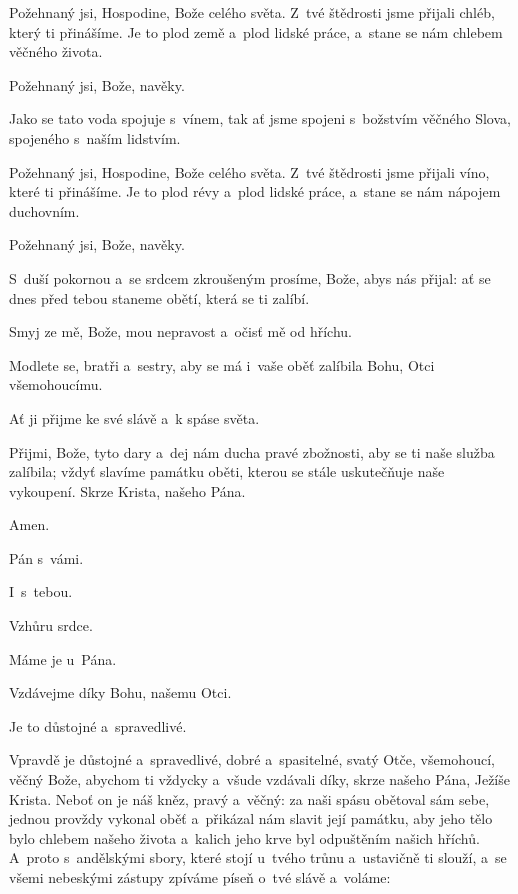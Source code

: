 \mbox{}

Požehnaný jsi, Hospodine, Bože celého světa. Z~tvé štědrosti jsme přijali chléb, který ti přinášíme. Je to plod země a~plod lidské práce, a~stane se nám chlebem věčného života.

\Rbardot{} Požehnaný jsi, Bože, navěky.

Jako se tato voda spojuje s~vínem, tak ať jsme spojeni s~božstvím věčného Slova, spojeného s~naším lidstvím.

Požehnaný jsi, Hospodine, Bože celého světa. Z~tvé štědrosti jsme přijali víno, které ti přinášíme. Je to plod révy a~plod lidské práce, a~stane se nám nápojem duchovním.

\Rbardot{} Požehnaný jsi, Bože, navěky.

\mbox{}

S~duší pokornou a~se srdcem zkroušeným prosíme, Bože, abys nás přijal: ať se dnes před tebou staneme obětí, která se ti zalíbí.

Smyj ze mě, Bože, mou nepravost a~očisť mě od hříchu.

\mbox{}

Modlete se, bratři a~sestry, aby se má i~vaše oběť zalíbila Bohu, Otci všemohoucímu.

\Rbardot{} Ať ji přijme ke své slávě a~k spáse světa.

\mbox{}

Přijmi, Bože, tyto dary a~dej nám ducha pravé zbožnosti, aby se ti naše služba zalíbila; vždyť slavíme památku oběti, kterou se stále uskutečňuje naše vykoupení. Skrze Krista, našeho Pána.

\Rbardot{} Amen.

\Vbardot{} Pán s~vámi.

\Rbardot{} I~s~tebou.

\Vbardot{} Vzhůru srdce.

\Rbardot{} Máme je u~Pána.

\Vbardot{} Vzdávejme díky Bohu, našemu Otci.

\Rbardot{} Je to důstojné a~spravedlivé.

\mbox{}

Vpravdě je důstojné a~spravedlivé, dobré a~spasitelné, svatý Otče, všemohoucí, věčný Bože, abychom ti vždycky a~všude vzdávali díky, skrze našeho Pána, Ježíše Krista. Neboť on je náš kněz, pravý a~věčný: za naši spásu obětoval sám sebe, jednou provždy vyko\-nal oběť a~přikázal nám slavit její památku, aby jeho tělo bylo chlebem našeho života a~kalich jeho krve byl odpuštěním našich hříchů. A~proto s~andělskými sbory, které stojí u~tvého trůnu a~ustavičně ti slouží, a~se všemi nebeskými zástupy zpíváme píseň o~tvé slávě a~voláme:

